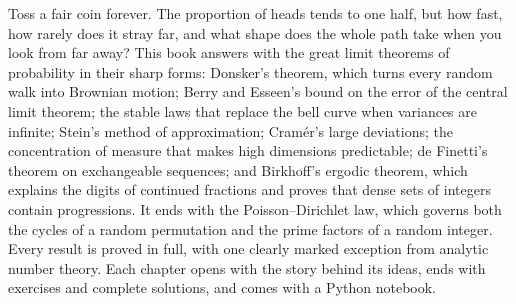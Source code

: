 Toss a fair coin forever. The proportion of heads tends to one half, but how fast, how rarely does it stray far, and what
shape does the whole path take when you look from far away? This book answers with the great limit theorems of probability
in their sharp forms: Donsker's theorem, which turns every random walk into Brownian motion; Berry and Esseen's bound on the
error of the central limit theorem; the stable laws that replace the bell curve when variances are infinite; Stein's method
of approximation; Cram\'er's large deviations; the concentration of measure that makes high dimensions predictable; de
Finetti's theorem on exchangeable sequences; and Birkhoff's ergodic theorem, which explains the digits of continued fractions
and proves that dense sets of integers contain progressions. It ends with the Poisson--Dirichlet law, which governs both the
cycles of a random permutation and the prime factors of a random integer. Every result is proved in full, with one clearly marked exception from analytic number theory. Each chapter
opens with the story behind its ideas, ends with exercises and complete solutions, and comes with a Python notebook.
